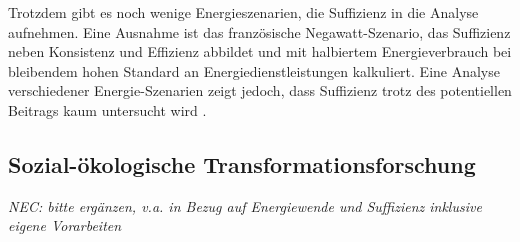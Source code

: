 \documentclass[a4paper,11pt,twoside]{scrartcl}
\begin{document}
Trotzdem gibt es noch wenige Energieszenarien, die Suffizienz in die Analyse aufnehmen. Eine Ausnahme ist das französische Negawatt-Szenario, das Suffizienz neben Konsistenz und Effizienz abbildet \cite{negawatt2017} und mit halbiertem Energieverbrauch bei bleibendem hohen Standard an Energiedienstleistungen kalkuliert. Eine Analyse verschiedener Energie-Szenarien zeigt jedoch, dass Suffizienz trotz des potentiellen Beitrags kaum untersucht wird \cite{SAMADI2017}.


\subsection*{Sozial-ökologische Transformationsforschung}
\textit{NEC: bitte ergänzen, v.a. in Bezug auf Energiewende und Suffizienz inklusive eigene Vorarbeiten}
    
\end{document}
